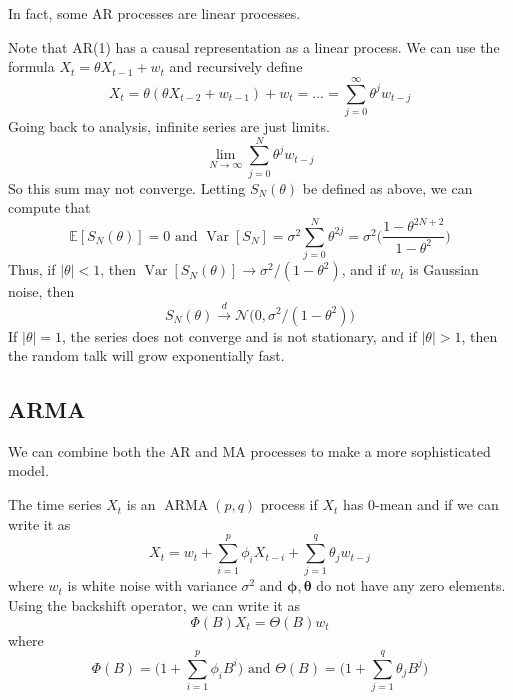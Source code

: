 \documentclass{article}
\DeclareMathOperator{\ARMA}{ARMA}
\DeclareMathOperator{\Var}{Var}
\begin{document}
    In fact, some AR processes are linear processes. 

    \begin{example}
      Note that AR(1) has a causal representation as a linear process. We can use the formula $X_t = \theta X_{t-1} + w_t$ and recursively define 
      \begin{equation}
        X_t = \theta(\theta X_{t-2} + w_{t-1}) + w_t = \ldots = \sum_{j=0}^\infty \theta^j w_{t-j}
      \end{equation}
      Going back to analysis, infinite series are just limits. 
      \begin{equation}
        \lim_{N \rightarrow \infty} \sum_{j=0}^N \theta^j w_{t-j} 
      \end{equation}
      So this sum may not converge. Letting $S_N (\theta)$ be defined as above, we can compute that 
      \begin{equation}
        \mathbb{E}[ S_N (\theta)] = 0 \text{ and } \Var[S_N] = \sigma^2 \sum_{j=0}^N \theta^{2j} = \sigma^2 \bigg( \frac{1 - \theta^{2N + 2}}{1 - \theta^2}\bigg)
      \end{equation}
      Thus, if $|\theta| < 1$, then $\Var[S_N (\theta)] \rightarrow \sigma^2 / (1 - \theta^2)$, and if $w_t$ is Gaussian noise, then 
      \begin{equation}
        S_N (\theta) \xrightarrow{d} \mathcal{N} \big( 0, \sigma^2 / (1 - \theta^2) \big)
      \end{equation}
      If $|\theta| = 1$, the series does not converge and is not stationary, and if $|\theta| > 1$, then the random talk will grow exponentially fast. 
    \end{example}

  \subsection{ARMA}

    We can combine both the AR and MA processes to make a more sophisticated model. 

    \begin{definition}[ARMA]
      The time series $X_t$ is an $\ARMA(p, q)$ process if $X_t$ has $0$-mean and if we can write it as 
      \begin{equation}
        X_t = w_t + \sum_{i=1}^p \phi_i X_{t-i} + \sum_{j=1}^q \theta_j w_{t-j}
      \end{equation}
      where $w_t$ is white noise with variance $\sigma^2$ and $\boldsymbol{\phi}, \boldsymbol{\theta}$ do not have any zero elements. Using the backshift operator, we can write it as 
      \begin{equation}
        \Phi(B) X_t = \Theta(B) w_t
      \end{equation}
      where 
      \begin{equation}
        \Phi(B) = \bigg( 1 + \sum_{i=1}^p \phi_i B^i \bigg) \text{ and } \Theta(B) = \bigg( 1 + \sum_{j=1}^q \theta_j B^j \bigg)
      \end{equation}
    \end{definition}
\end{document}
